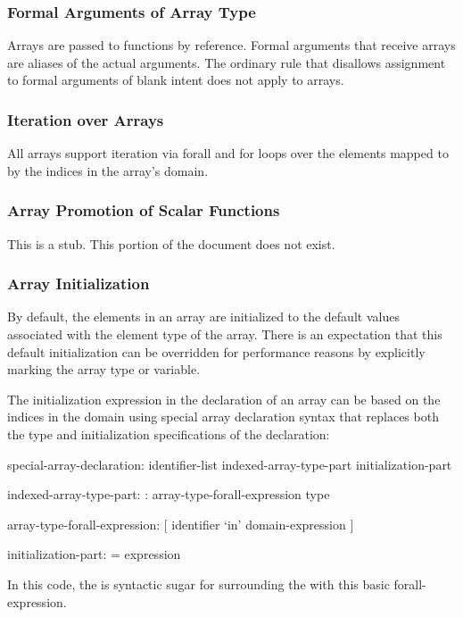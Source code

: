 \subsubsection{Formal Arguments of Array Type}
\label{Formal_Arguments_of_Array_Type}

Arrays are passed to functions by reference.  Formal arguments that
receive arrays are aliases of the actual arguments.  The ordinary rule
that disallows assignment to formal arguments of blank intent does not
apply to arrays.

\subsubsection{Iteration over Arrays}
\label{Iteration_over_Arrays}

All arrays support iteration via forall and for loops over the
elements mapped to by the indices in the array's domain.

\subsubsection{Array Promotion of Scalar Functions}
\label{Array_Promotion_of_Scalar_Functions}

This is a stub.  This portion of the document does not exist.

\subsubsection{Array Initialization}
\label{Array_Initialization}

By default, the elements in an array are initialized to the default
values associated with the element type of the array.  There is an
expectation that this default initialization can be overridden for
performance reasons by explicitly marking the array type or variable.

The initialization expression in the declaration of an array can be
based on the indices in the domain using special array declaration
syntax that replaces both the type and initialization specifications
of the declaration:
\begin{syntax}
special-array-declaration:
  identifier-list indexed-array-type-part initialization-part

indexed-array-type-part:
  : array-type-forall-expression type

array-type-forall-expression:
  [ identifier `in' domain-expression ]

initialization-part:
  = expression
\end{syntax}
In this code, the  is syntactic
sugar for surrounding the  with this basic
forall-expression.

